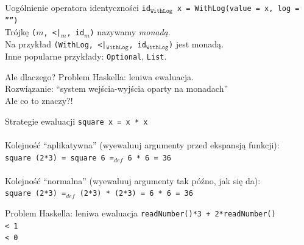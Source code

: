 \documentclass{beamer}
\begin{document}
\begin{frame}{Uogólnienie operatora identyczności}
  \texttt{id$_\mathtt{WithLog}$ x = WithLog(value = x, log = '''')} \\ \pause
  Trójkę \texttt{($m$, <|$_m$, id$_m$)} nazywamy \textit{monadą}. \\ \pause
  Na przykład \texttt{(WithLog, <|$_\mathtt{WithLog}$, id$_\mathtt{WithLog}$)}
  jest monadą. \\ \pause
  Inne popularne przykłady: \texttt{Optional}, \texttt{List}.


\end{frame}

\begin{frame}{Ale dlaczego?}
  \pause
  Problem Haskella: leniwa ewaluacja. \\ \pause
  Rozwiązanie: ``system wejścia-wyjścia oparty na monadach'' \\ \pause
  Ale co to znaczy?!
\end{frame}

\begin{frame}{Strategie ewaluacji}
  \texttt{square x = x * x} \\ \pause
  \ \\
  Kolejność ``aplikatywna'' (wyewaluuj argumenty przed ekspansją funkcji): \\ \pause
  \texttt{square (2*3) \pause = square 6 \pause =$_{def}$ 6 * 6 \pause = 36} \\ \pause
  \ \\
  Kolejność ``normalna'' (wyewaluuj argumenty tak późno, jak się da): \\ \pause
  \texttt{square (2*3) \pause =$_{def}$ (2*3) * (2*3) \pause = 6 * 6 \pause = 36}
\end{frame}


\begin{frame}{Problem Haskella: leniwa ewaluacja}
  \texttt{readNumber()*3 + 2*readNumber()} \\ \pause
  \texttt{\phantom{}< 1} \\ \pause
  \texttt{\phantom{}< 0} \\  
\end{frame}
\end{document}
